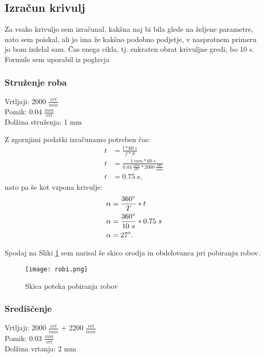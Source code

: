 \subsection{Izračun krivulj}
Za vsako krivuljo sem izračunal, kakšna naj bi bila glede na
željene parametre, nato sem poiskal, ali jo ima že kakšno podobno
podjetje, v nasprotnem primeru jo bom izdelal sam.
Čas enega cikla, tj. enkraten obrat krivuljne gredi, bo 10 s.
Formule sem uporabil iz poglavja 

\subsubsection{Struženje roba}
Vrtljaji: 2000 \( \frac{vrt}{min} \) \\
Pomik: 0.04 \( \frac{mm}{vrt} \) \\
Dolžina struženja: 1 mm

Z zgornjimi podatki izračunamo potreben čas:
\begin{equation}
	\begin{split}
		t &= \frac{l*60\ s}{f*S} \\
		t &= \frac{1\ mm*60\ s}{0.04\ \frac{mm}{obr}*2000\ \frac{obr}{min}} \\
		t &= 0.75\ s,
	\end{split}
\end{equation}
nato pa še kot vzpona krivulje:
\begin{equation}
	\begin{split}
		\alpha &= \frac{360\degree}{T} * t \\
		\alpha &= \frac{360\degree}{10\ s} * 0.75\ s\\
		\alpha &= 27\degree.
	\end{split}
\end{equation}

Spodaj na Sliki \ref{shema_robov} sem narisal še skico orodja
in obdelovanca pri pobiranju robov.
\begin{figure}[H]
	\begin{center}
		\texttt{[image: robi.png]}
		\caption{Skica poteka pobiranja robov
			\cite{lasten}}
		\label{shema_robov}
	\end{center}
\end{figure}

\subsubsection{Središčenje}
Vrtljaji: 2000 \( \frac{vrt}{min} \) + 2200 \( \frac{vrt}{min} \)\\
Pomik: 0.03 \( \frac{mm}{vrt} \) \\
Dolžina vrtanja: 2 mm

